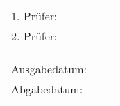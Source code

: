 \begin{titlepage}
\begin{center}
{\begin{tabular}{lll}
	
			1. Prüfer: & \prueferA \\
			2. Prüfer: & \prueferB \\ \\ \\ \\
			
			Ausgabedatum: & \ausgabedatum \\
			Abgabedatum: & \abgabedatum
		\end{tabular}
		\makeatother}
	\endgroup
\end{center}


\end{titlepage}


